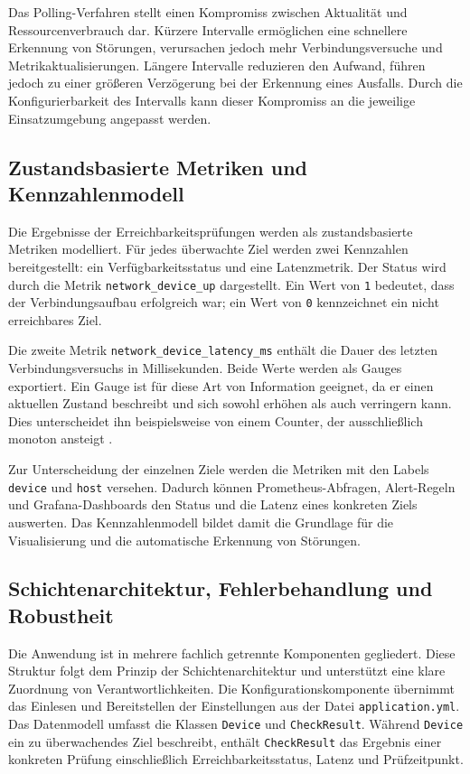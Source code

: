 Das Polling-Verfahren stellt einen Kompromiss zwischen Aktualität und Ressourcenverbrauch dar. Kürzere Intervalle ermöglichen eine schnellere Erkennung von Störungen, verursachen jedoch mehr Verbindungsversuche und Metrikaktualisierungen. Längere Intervalle reduzieren den Aufwand, führen jedoch zu einer größeren Verzögerung bei der Erkennung eines Ausfalls. Durch die Konfigurierbarkeit des Intervalls kann dieser Kompromiss an die jeweilige Einsatzumgebung angepasst werden.

\subsection{Zustandsbasierte Metriken und Kennzahlenmodell}

Die Ergebnisse der Erreichbarkeitsprüfungen werden als zustandsbasierte Metriken modelliert. Für jedes überwachte Ziel werden zwei Kennzahlen bereitgestellt: ein Verfügbarkeitsstatus und eine Latenzmetrik. Der Status wird durch die Metrik \texttt{network\_device\_up} dargestellt. Ein Wert von \texttt{1} bedeutet, dass der Verbindungsaufbau erfolgreich war; ein Wert von \texttt{0} kennzeichnet ein nicht erreichbares Ziel.

Die zweite Metrik \texttt{network\_device\_latency\_ms} enthält die Dauer des letzten Verbindungsversuchs in Millisekunden. Beide Werte werden als Gauges exportiert. Ein Gauge ist für diese Art von Information geeignet, da er einen aktuellen Zustand beschreibt und sich sowohl erhöhen als auch verringern kann. Dies unterscheidet ihn beispielsweise von einem Counter, der ausschließlich monoton ansteigt \cite{prometheus:metric-types}.

Zur Unterscheidung der einzelnen Ziele werden die Metriken mit den Labels \texttt{device} und \texttt{host} versehen. Dadurch können Prometheus-Abfragen, Alert-Regeln und Grafana-Dashboards den Status und die Latenz eines konkreten Ziels auswerten. Das Kennzahlenmodell bildet damit die Grundlage für die Visualisierung und die automatische Erkennung von Störungen.

\subsection{Schichtenarchitektur, Fehlerbehandlung und Robustheit}

Die Anwendung ist in mehrere fachlich getrennte Komponenten gegliedert. Diese Struktur folgt dem Prinzip der Schichtenarchitektur und unterstützt eine klare Zuordnung von Verantwortlichkeiten. Die Konfigurationskomponente übernimmt das Einlesen und Bereitstellen der Einstellungen aus der Datei \texttt{application.yml}. Das Datenmodell umfasst die Klassen \texttt{Device} und \texttt{CheckResult}. Während \texttt{Device} ein zu überwachendes Ziel beschreibt, enthält \texttt{CheckResult} das Ergebnis einer konkreten Prüfung einschließlich Erreichbarkeitsstatus, Latenz und Prüfzeitpunkt.

